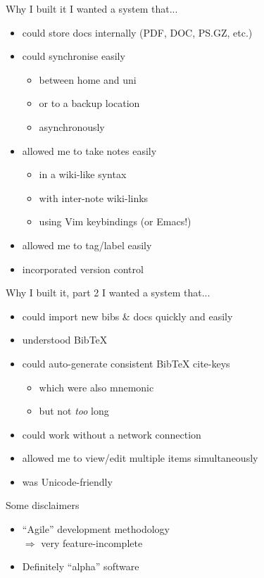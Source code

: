 \documentclass[sansserif]{beamer}
\begin{document}
\begin{frame}{Why I built it}
	I wanted a system that...
	\begin{itemize}
		\item could store docs internally (PDF, DOC, PS.GZ, etc.)
		\item could synchronise easily
		\begin{itemize}
			\item between home and uni
			\item or to a backup location
			\item asynchronously
		\end{itemize}
		\item allowed me to take notes easily
		\begin{itemize}
			\item in a wiki-like syntax
			\item with inter-note wiki-links
			\item using Vim keybindings (or Emacs!)
		\end{itemize}
		\item allowed me to tag/label easily
		\item incorporated version control
	\end{itemize}
\end{frame}

\begin{frame}{Why I built it, part 2}
	I wanted a system that...
	\begin{itemize}
		\item could import new bibs \& docs quickly and easily
		\item understood BibTeX
		\item could auto-generate consistent BibTeX cite-keys
		\begin{itemize}
			\item which were also mnemonic
			\item but not \textit{too} long
		\end{itemize}
		\item could work without a network connection
		\item allowed me to view/edit multiple items simultaneously
		\item was Unicode-friendly
	\end{itemize}
\end{frame}

\begin{frame}{Some disclaimers}
	\begin{itemize}
		\item ``Agile'' development methodology
		\\ \hspace{2em} $\Rightarrow$ very feature-incomplete \vspace{1em}
		\item Definitely ``alpha'' software
	\end{itemize}
\end{frame}
\end{document}
